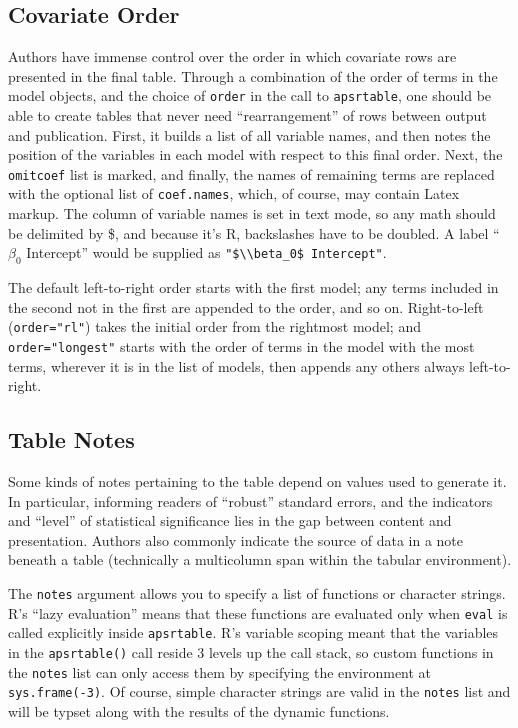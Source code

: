 \documentclass[10pt]{article} %
\begin{document}
\subsection{Covariate Order}
\label{sec:covariate-order}


Authors have immense control over the order in which covariate rows are presented in the final table. Through a combination of the order of terms in the model objects, and the choice of \verb|order| in the call to \verb|apsrtable|, one should be able to create tables that never need ``rearrangement'' of rows between output and publication. First, it builds a list of all variable names, and then notes the position of the variables in each model with respect to this final order. Next, the \verb|omitcoef| list is marked, and finally, the names of remaining terms are replaced with the optional list of \verb|coef.names|, which, of course, may contain Latex
 markup. The column of variable names is set in text mode, so any math should be delimited by \$, and because it's R, backslashes have to be doubled. A label ``$\beta_0$ Intercept'' would be supplied as \verb|"$\\beta_0$ Intercept"|.

The default left-to-right order starts with the first model; any terms included in the second not in the first are appended to the order, and so on. Right-to-left (\verb|order="rl"|) takes the initial order from the rightmost model; and \verb|order="longest"| starts with the order of terms in the model with the most terms, wherever it is in the list of models, then appends any others always left-to-right.

\subsection{Table Notes}
\label{sec:table-notes}

Some kinds of notes pertaining to the table depend on values used to generate it. In particular, informing readers of ``robust'' standard errors, and the indicators and ``level'' of statistical significance lies in the gap between content and presentation. Authors also commonly indicate the source of data in a note beneath a table (technically a multicolumn span within the tabular environment). 

The \verb|notes| argument allows you to specify a list of functions or character strings. R's ``lazy evaluation'' means that these functions are evaluated only when \verb|eval| is called explicitly inside \verb|apsrtable|. R's variable scoping meant that the variables in the \verb|apsrtable()| call reside 3 levels up the call stack, so custom functions in the \verb|notes| list can only access them by specifying the environment at \verb|sys.frame(-3)|. Of course, simple character strings are valid in the \verb|notes| list and will be typset along with the results of the dynamic functions.
\end{document}
